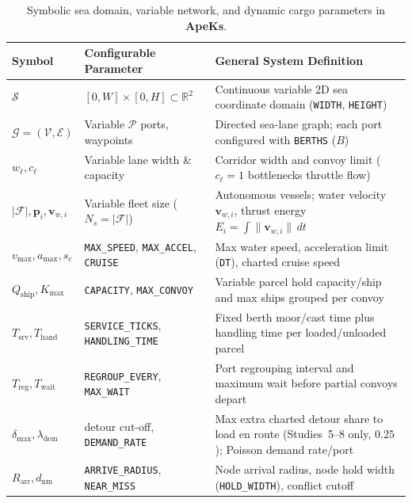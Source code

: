 \documentclass[11pt,a4paper,oneside]{report}
\begin{document}
\begin{table}[H]
\centering
\caption[Symbolic environment and cargo notations]{Symbolic sea domain, variable network, and dynamic cargo parameters in \textbf{ApeKs}.}
\label{tab:notations-env}
\begin{tabularx}{\textwidth}{@{}ll>{\raggedright\arraybackslash}X@{}}
\toprule
\textbf{Symbol} & \textbf{Configurable Parameter} & \textbf{General System Definition} \\
\midrule
$\mathcal{S}$ & $[0, W] \times [0, H] \subset \mathbb{R}^2$ & Continuous variable 2D sea coordinate domain (\texttt{WIDTH}, \texttt{HEIGHT}) \\
$\mathcal{G} = (\mathcal{V}, \mathcal{E})$ & Variable $\mathcal{P}$ ports, waypoints & Directed sea-lane graph; each port configured with \texttt{BERTHS} ($B$) \\
$w_\ell, c_\ell$ & Variable lane width \& capacity & Corridor width and convoy limit ($c_\ell=1$ bottlenecks throttle flow) \\
$|\mathcal{F}|, \mathbf{p}_i, \mathbf{v}_{w,i}$ & Variable fleet size ($N_s = |\mathcal{F}|$) & Autonomous vessels; water velocity $\mathbf{v}_{w,i}$, thrust energy $E_i = \int \|\mathbf{v}_{w,i}\|\,dt$ \\
$v_{\max}, a_{\max}, s_c$ & \texttt{MAX\_SPEED}, \texttt{MAX\_ACCEL}, \texttt{CRUISE} & Max water speed, acceleration limit (\texttt{DT}), charted cruise speed \\
$Q_{\text{ship}}, K_{\max}$ & \texttt{CAPACITY}, \texttt{MAX\_CONVOY} & Variable parcel hold capacity/ship and max ships grouped per convoy \\
$T_{\text{srv}}, T_{\text{hand}}$ & \texttt{SERVICE\_TICKS}, \texttt{HANDLING\_TIME} & Fixed berth moor/cast time plus handling time per loaded/unloaded parcel \\
$T_{\text{reg}}, T_{\text{wait}}$ & \texttt{REGROUP\_EVERY}, \texttt{MAX\_WAIT} & Port regrouping interval and maximum wait before partial convoys depart \\
$\delta_{\max}, \lambda_{\text{dem}}$ & detour cut-off, \texttt{DEMAND\_RATE} & Max extra charted detour share to load en route (Studies~5--8 only, $0.25$); Poisson demand rate/port \\
$R_{\text{arr}}, d_{\text{nm}}$ & \texttt{ARRIVE\_RADIUS}, \texttt{NEAR\_MISS} & Node arrival radius, node hold width (\texttt{HOLD\_WIDTH}), conflict cutoff \\
\bottomrule
\end{tabularx}
\end{table}
\end{document}
